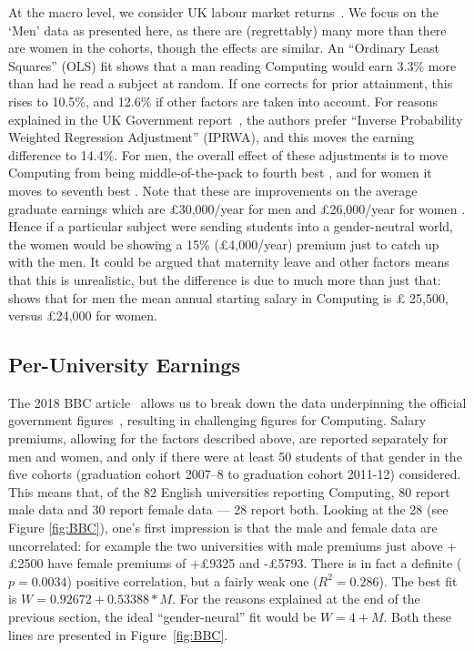 \documentclass[conference]{IEEEtran}
\begin{document}
At the macro level, we consider UK labour market returns~\cite[Table
5]{DfE2018d}. We focus on the `Men' data as presented here, as there
are (regrettably) many more than there are women in the cohorts,
though the effects are similar. An ``Ordinary Least Squares'' (OLS)
fit shows that a man reading Computing would earn 3.3\% more than had
he read a subject at random. If one corrects for prior attainment,
this rises to 10.5\%, and 12.6\% if other factors are taken into
account. For reasons explained in the UK Government
report~\cite[\S4.2]{DfE2018d}, the authors prefer ``Inverse
Probability Weighted Regression Adjustment'' (IPRWA), and this moves
the earning difference to 14.4\%. For men, the overall effect of these
adjustments is to move Computing from being middle-of-the-pack
\cite[Figure 15]{DfE2018d} to fourth best \cite[Figure 17]{DfE2018d},
and for women it moves to seventh best \cite[Figure
16]{DfE2018d}. Note that these are improvements on the average
graduate earnings which are \pounds30,000/year for men and
\pounds26,000/year for women \cite[p. 37]{DfE2018d}. Hence if a
particular subject were sending students into a gender-neutral world,
the women would be showing a 15\% (\pounds4,000/year) premium just to
catch up with the men.  It could be argued that maternity leave and
other factors means that this is unrealistic, but the difference is
due to much more than just that: \cite[Figure 14]{HESA2018b} shows
that for men the mean annual starting salary in Computing is \pounds
25,500, versus \pounds24,000 for women.

\subsection{Per-University Earnings}

The 2018 BBC article~\cite{BBC2018f} allows us to break down the data
underpinning the official government figures~\cite{DfE2018d},
resulting in challenging figures for Computing. Salary premiums,
allowing for the factors described above, are reported separately for
men and women, and only if there were at least 50 students of that
gender in the five cohorts (graduation cohort 2007--8 to graduation
cohort 2011-12) considered. This means that, of the 82 English
universities reporting Computing, 80 report male data and 30 report
female data --- 28 report both. Looking at the 28 (see Figure
\ref{fig:BBC}), one's first impression is that the male and female
data are uncorrelated: for example the two universities with male
premiums just above +\pounds2500 have female premiums of +\pounds9325
and -\pounds5793. There is in fact a definite ($p=0.0034$) positive
correlation, but a fairly weak one ($R^2=0.286$). The best fit is
$W=0.92672+0.53388*M$. For the reasons explained at the end of the
previous section, the ideal ``gender-neural'' fit would be
$W=4+M$. Both these lines are presented in Figure~\ref{fig:BBC}.
\end{document}
